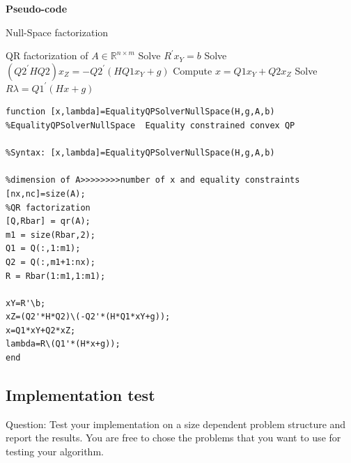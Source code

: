 {\setmainfont{Times New Roman}\bfseries Pseudo-code}
\begin{algorithm}[!h]
	\caption{Null-Space factorization}
	\begin{algorithmic}[1]
	    \STATE QR factorization of $A \in \mathbb{R}^{n \times m}$
		\STATE Solve $R^{\prime}x_Y=b$
		\STATE Solve $\left(Q2^{\prime}HQ2\right)x_Z=-Q2^{\prime}\left(HQ1x_Y+g\right)$
		\STATE Compute $x=Q1x_Y+Q2x_Z$
		\STATE Solve $R\lambda=Q1^{\prime}\left(Hx+g\right)$
	\end{algorithmic}
\end{algorithm}


{\setmainfont{Courier New Bold} \scriptsize            
\begin{lstlisting}
function [x,lambda]=EqualityQPSolverNullSpace(H,g,A,b)
%EqualityQPSolverNullSpace  Equality constrained convex QP

%Syntax: [x,lambda]=EqualityQPSolverNullSpace(H,g,A,b)

%dimension of A>>>>>>>>number of x and equality constraints
[nx,nc]=size(A);
%QR factorization
[Q,Rbar] = qr(A);
m1 = size(Rbar,2);
Q1 = Q(:,1:m1); 
Q2 = Q(:,m1+1:nx);
R = Rbar(1:m1,1:m1);

xY=R'\b;
xZ=(Q2'*H*Q2)\(-Q2'*(H*Q1*xY+g));
x=Q1*xY+Q2*xZ;
lambda=R\(Q1'*(H*x+g));
end
\end{lstlisting}}


\newpage
\subsection{\bfseries Implementation test}
\begin{shaded}
{Question: Test your implementation on a size dependent problem structure and report the
results. You are free to chose the problems that you want to use for testing your
algorithm.}
\end{shaded}
